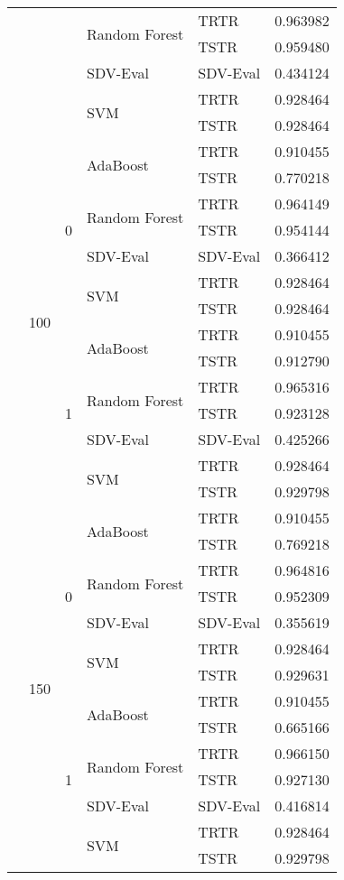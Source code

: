\begin{longtable}{lllllr}
\cline{4-6}
 &  &  & \multirow[t]{2}{*}{Random Forest} & TRTR & 0.963982 \\
 &  &  &  & TSTR & 0.959480 \\
\cline{4-6}
 &  &  & SDV-Eval & SDV-Eval & 0.434124 \\
\cline{4-6}
 &  &  & \multirow[t]{2}{*}{SVM} & TRTR & 0.928464 \\
 &  &  &  & TSTR & 0.928464 \\
\cline{2-6} \cline{3-6} \cline{4-6}
 & \multirow[t]{14}{*}{100} & \multirow[t]{7}{*}{0} & \multirow[t]{2}{*}{AdaBoost} & TRTR & 0.910455 \\
 &  &  &  & TSTR & 0.770218 \\
\cline{4-6}
 &  &  & \multirow[t]{2}{*}{Random Forest} & TRTR & 0.964149 \\
 &  &  &  & TSTR & 0.954144 \\
\cline{4-6}
 &  &  & SDV-Eval & SDV-Eval & 0.366412 \\
\cline{4-6}
 &  &  & \multirow[t]{2}{*}{SVM} & TRTR & 0.928464 \\
 &  &  &  & TSTR & 0.928464 \\
\cline{3-6} \cline{4-6}
 &  & \multirow[t]{7}{*}{1} & \multirow[t]{2}{*}{AdaBoost} & TRTR & 0.910455 \\
 &  &  &  & TSTR & 0.912790 \\
\cline{4-6}
 &  &  & \multirow[t]{2}{*}{Random Forest} & TRTR & 0.965316 \\
 &  &  &  & TSTR & 0.923128 \\
\cline{4-6}
 &  &  & SDV-Eval & SDV-Eval & 0.425266 \\
\cline{4-6}
 &  &  & \multirow[t]{2}{*}{SVM} & TRTR & 0.928464 \\
 &  &  &  & TSTR & 0.929798 \\
\cline{2-6} \cline{3-6} \cline{4-6}
 & \multirow[t]{14}{*}{150} & \multirow[t]{7}{*}{0} & \multirow[t]{2}{*}{AdaBoost} & TRTR & 0.910455 \\
 &  &  &  & TSTR & 0.769218 \\
\cline{4-6}
 &  &  & \multirow[t]{2}{*}{Random Forest} & TRTR & 0.964816 \\
 &  &  &  & TSTR & 0.952309 \\
\cline{4-6}
 &  &  & SDV-Eval & SDV-Eval & 0.355619 \\
\cline{4-6}
 &  &  & \multirow[t]{2}{*}{SVM} & TRTR & 0.928464 \\
 &  &  &  & TSTR & 0.929631 \\
\cline{3-6} \cline{4-6}
 &  & \multirow[t]{7}{*}{1} & \multirow[t]{2}{*}{AdaBoost} & TRTR & 0.910455 \\
 &  &  &  & TSTR & 0.665166 \\
\cline{4-6}
 &  &  & \multirow[t]{2}{*}{Random Forest} & TRTR & 0.966150 \\
 &  &  &  & TSTR & 0.927130 \\
\cline{4-6}
 &  &  & SDV-Eval & SDV-Eval & 0.416814 \\
\cline{4-6}
 &  &  & \multirow[t]{2}{*}{SVM} & TRTR & 0.928464 \\
 &  &  &  & TSTR & 0.929798 \\
\cline{1-6} \cline{2-6} \cline{3-6} \cline{4-6}
\end{longtable}

